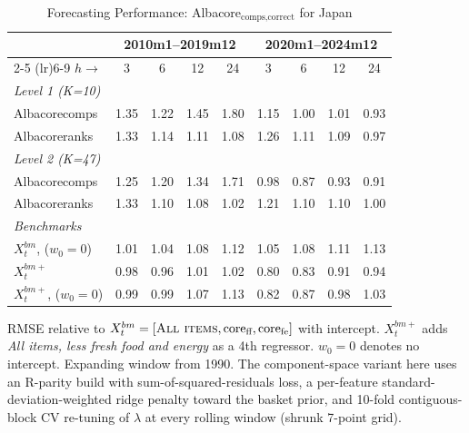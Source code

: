 \begin{table}[htbp]
\centering
\caption{Forecasting Performance: Albacore$_{\text{comps,correct}}$ for Japan}
\label{tab:horizon_table_correct}
\begin{tabular}{lcccccccc}
\toprule
 & \multicolumn{4}{c}{2010m1--2019m12} & \multicolumn{4}{c}{2020m1--2024m12} \\
\cmidrule(lr){2-5} \cmidrule(lr){6-9}
$h \to$ & 3 & 6 & 12 & 24 & 3 & 6 & 12 & 24 \\
\midrule
\multicolumn{9}{l}{\textit{Level 1 (K=10)}} \\
Albacorecomps & 1.35 & 1.22 & 1.45 & 1.80 & 1.15 & 1.00 & 1.01 & 0.93 \\
Albacoreranks & 1.33 & 1.14 & 1.11 & 1.08 & 1.26 & 1.11 & 1.09 & 0.97 \\
\multicolumn{9}{l}{\textit{Level 2 (K=47)}} \\
Albacorecomps & 1.25 & 1.20 & 1.34 & 1.71 & 0.98 & 0.87 & 0.93 & 0.91 \\
Albacoreranks & 1.33 & 1.10 & 1.08 & 1.02 & 1.21 & 1.10 & 1.10 & 1.00 \\
\multicolumn{9}{l}{\textit{Benchmarks}} \\
$X^{bm}_t$, ($w_0{=}0$) & 1.01 & 1.04 & 1.08 & 1.12 & 1.05 & 1.08 & 1.11 & 1.13 \\
$X^{bm+}_t$ & 0.98 & 0.96 & 1.01 & 1.02 & 0.80 & 0.83 & 0.91 & 0.94 \\
$X^{bm+}_t$, ($w_0{=}0$) & 0.99 & 0.99 & 1.07 & 1.13 & 0.82 & 0.87 & 0.98 & 1.03 \\
\bottomrule
\end{tabular}
\begin{tablenotes}\footnotesize\item RMSE relative to $X^{bm}_t = [\textsc{All items}, \text{core}_{\text{ff}}, \text{core}_{\text{fe}}]$ with intercept. $X^{bm+}_t$ adds \textit{All items, less fresh food and energy} as a 4th regressor. $w_0{=}0$ denotes no intercept. Expanding window from 1990. The component-space variant here uses an R-parity build with sum-of-squared-residuals loss, a per-feature standard-deviation-weighted ridge penalty toward the basket prior, and 10-fold contiguous-block CV re-tuning of $\lambda$ at every rolling window (shrunk 7-point grid).\end{tablenotes}
\end{table}
